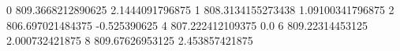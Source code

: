 0 809.3668212890625 2.1444091796875
1 808.3134155273438 1.09100341796875
2 806.697021484375 -0.525390625
4 807.222412109375 0.0
6 809.22314453125 2.000732421875
8 809.67626953125 2.453857421875

